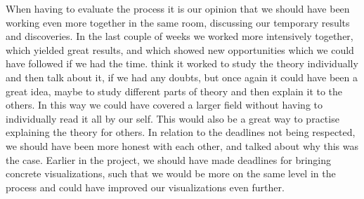 \documentclass[Report.tex]{subfiles}
\begin{document}
When having to evaluate the process it is our opinion that we should have been working even more together in the same room, discussing our temporary results and discoveries. In the last couple of weeks we worked more intensively together, which yielded great results, and which showed new opportunities which we could have followed if we had the time. think it worked to study the theory individually and then talk about it, if we had any doubts, but once again it could have been a great idea, maybe to study different parts of theory and then explain it to the others. In this way we could have covered a larger field without having to individually read it all by our self. This would also be a great way to practise explaining the theory for others. In relation to the deadlines not being respected, we should have been more honest with each other, and talked about why this was the case. Earlier in the project, we should have made deadlines for bringing concrete visualizations, such that we would be more on the same level in the process and could have improved our visualizations even further.
\thispagestyle{empty}
\end{document}
